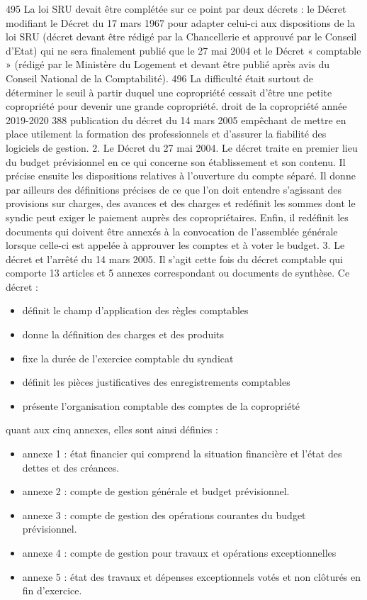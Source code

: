 495 La loi SRU devait être complétée sur ce point par deux décrets : le Décret modifiant le Décret du 17 mars 1967 pour adapter celui-ci aux dispositions de la loi SRU (décret devant être rédigé par la Chancellerie et approuvé par le Conseil d’Etat) qui ne sera finalement publié que le 27 mai 2004 et le Décret « comptable » (rédigé par le Ministère du Logement et devant être publié après avis du Conseil National de la Comptabilité).
496 La difficulté était surtout de déterminer le seuil à partir duquel une copropriété cessait d'être une petite copropriété pour devenir une grande copropriété.
droit de la copropriété année 2019-2020
388
publication du décret du 14 mars 2005 empêchant de mettre en place utilement la formation des professionnels et d'assurer la fiabilité des logiciels de gestion.
2. Le Décret du 27 mai 2004.
Le décret traite en premier lieu du budget prévisionnel en ce qui concerne son établissement et son contenu.
Il précise ensuite les dispositions relatives à l'ouverture du compte séparé.
Il donne par ailleurs des définitions précises de ce que l'on doit entendre s'agissant des provisions sur charges, des avances et des charges et redéfinit les sommes dont le syndic peut exiger le paiement auprès des copropriétaires.
Enfin, il redéfinit les documents qui doivent être annexés à la convocation de l'assemblée générale lorsque celle-ci est appelée à approuver les comptes et à voter le budget.
3. Le décret et l'arrêté du 14 mars 2005.
Il s'agit cette fois du décret comptable qui comporte 13 articles et 5 annexes correspondant ou documents de synthèse. Ce décret :
\begin{itemize}
	\item définit le champ d'application des règles comptables
	\item donne la définition des charges et des produits
	\item fixe la durée de l'exercice comptable du syndicat
	\item définit les pièces justificatives des enregistrements comptables
	\item présente l’organisation comptable des comptes de la copropriété
\end{itemize}
quant aux cinq annexes, elles sont ainsi définies :
\begin{itemize}
	\item annexe 1 : état financier qui comprend la situation financière et l'état des dettes et des créances.
	\item annexe 2 : compte de gestion générale et budget prévisionnel.
	\item annexe 3 : compte de gestion des opérations courantes du budget prévisionnel.
	\item annexe 4 : compte de gestion pour travaux et opérations exceptionnelles
	\item annexe 5 : état des travaux et dépenses exceptionnels votés et non clôturés en fin d'exercice.
\end{itemize}
